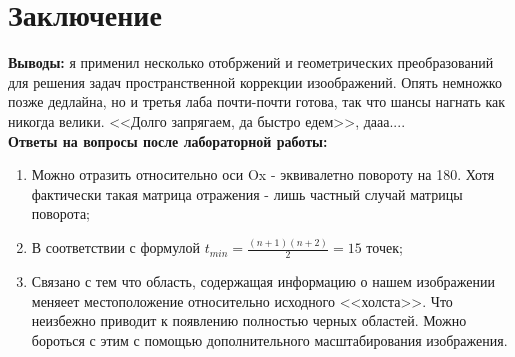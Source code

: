 \section{Заключение}
\noindent \textbf{Выводы: } я применил несколько отобржений и геометрических преобразований для решения задач пространственной коррекции изоображений.
Опять немножко позже дедлайна, но и третья лаба почти-почти готова, так что шансы нагнать как никогда велики. <<Долго запрягаем, да быстро едем>>, дааа....
\\ \textbf{Ответы на вопросы после лабораторной работы: } 
\begin{enumerate}
    \item Можно отразить относительно оси Ox - эквивалетно повороту на 180. Хотя фактически такая матрица отражения - лишь частный случай матрицы поворота; 
    \item В соответствии с формулой $t_{min} = \frac{(n+1)(n+2)}{2} = 15$ точек;
    \item Связано с тем что область, содержащая информацию о нашем изображении меняеет местоположение относительно исходного <<холста>>. Что неизбежно приводит к появлению полностью черных областей. Можно бороться с этим с помощью дополнительного масштабирования изображения.
\end{enumerate}

 